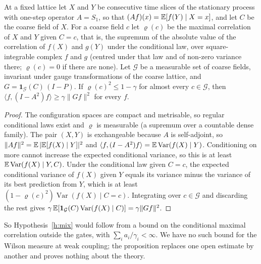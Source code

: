 \begin{proposition}\label{p:pred}
At a fixed lattice let $X$ and $Y$ be consecutive time slices of the stationary process with one-step operator
$A=S_1$, so that $(Af)(x)=\mathbb{E}[f(Y)\mid X=x]$, and let $C$ be the coarse field of $X$. For a coarse field $c$ let
$\varrho(c)$ be the maximal correlation of $X$ and $Y$ given $C=c$, that is, the supremum of the absolute value of the correlation
of $f(X)$ and $g(Y)$ under the conditional law, over square-integrable complex $f$ and $g$ (centred under
that law and of non-zero variance there; $\varrho(c)=0$ if there are none). Let $\mathcal G$ be a
measurable set of coarse fields, invariant under gauge transformations of the coarse lattice, and $G=\mathbf 1_{\mathcal G}(C)\,(I-P)$. If $\varrho(c)^2\le1-\gamma$ for
almost every $c\in\mathcal G$, then $\langle f,(I-A^2)f\rangle\ge\gamma\|Gf\|^2$ for every $f$.
\end{proposition}
\begin{proof}
The configuration spaces are compact and metrisable, so regular conditional laws exist and $\varrho$ is
measurable (a supremum over a countable dense family). The pair $(X,Y)$ is exchangeable because $A$ is self-adjoint, so $\|Af\|^2=\mathbb{E}\,|\mathbb{E}[f(X)\mid Y]|^2$ and
$\langle f,(I-A^2)f\rangle=\mathbb{E}\operatorname{Var}(f(X)\mid Y)$. Conditioning on more cannot increase the expected
conditional variance, so this is at least $\mathbb{E}\operatorname{Var}(f(X)\mid Y,C)$. Under the conditional law given
$C=c$, the expected conditional variance of $f(X)$ given $Y$ equals its variance minus the variance of its
best prediction from $Y$, which is at least $(1-\varrho(c)^2)\operatorname{Var}(f(X)\mid C=c)$. Integrating
over $c\in\mathcal G$ and discarding the rest gives
$\gamma\,\mathbb{E}[\mathbf 1_{\mathcal G}(C)\operatorname{Var}(f(X)\mid C)]=\gamma\|Gf\|^2$.
\end{proof}

So Hypothesis~\ref{h:mix} would follow from a bound on the conditional maximal correlation outside the
gates, with $\sum_ia_i/\gamma_i<\infty$. We have no such bound for the Wilson measure at weak coupling; the
proposition replaces one open estimate by another and proves nothing about the theory.

